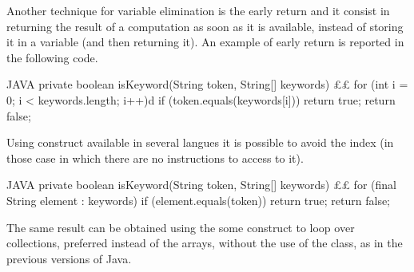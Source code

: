 Another technique for variable elimination is the early return and it consist
in returning the result of a computation as soon as it is available, instead of
storing it in a variable (and then returning it).  An example of early return
is reported in the following code.

\begin{code}{JAVA}
private boolean isKeyword(String token, String[] keywords) {££
    for (int i = 0; i < keywords.length; i++)d
        if (token.equals(keywords[i]))
            return true;
    return false;
}
\end{code}

Using  construct available in several langues it is possible to
avoid the index (in those case in which there are no instructions to access to
it).
\begin{code}{JAVA}
private boolean isKeyword(String token, String[] keywords) {££
    for (final String element : keywords)
        if (element.equals(token))
            return true;
    return false;
}
\end{code}
The same result can be obtained using the some construct to loop over collections,
preferred instead of the arrays, without the use of the  class, as
in the previous versions of Java.



